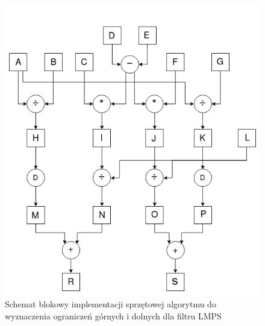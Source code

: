 \begin{figure}[h]
	\centering
	\includegraphics[scale=0.4]{impl_dev_lmps_1.png}
	\caption{Schemat blokowy implementacji sprzętowej algorytmu do wyznaczenia ograniczeń górnych i dolnych dla filtru LMPS}
	\label{fig:lmps1}
\end{figure}


